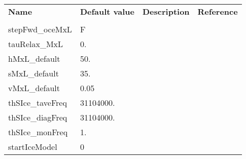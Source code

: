 \begin{table}
\hspace*{-1.5in}
\begin{tabular}{lllc}

  \textbf{Name}  &  \textbf{Default value}  
    &  \textbf{Description}   &  \textbf{Reference}  \\
  & & & \\

  stepFwd\_oceMxL  &   F
    &  %
    &  %
    \\
  tauRelax\_MxL   &   0.
    &  %
    &  %
    \\
  hMxL\_default   &   50.
    &  %
    &  %
    \\
  sMxL\_default   &   35.
    &  %
    &  %
    \\
  vMxL\_default   &   0.05
    &  %
    &  %
    \\
  thSIce\_taveFreq  &   31104000.
    &  %
    &  %
    \\
  thSIce\_diagFreq  &   31104000.
    &  %
    &  %
    \\
  thSIce\_monFreq   &   1.
    &  %
    &  %
    \\
  startIceModel   &   0
    &  %
    &  %
    \\

\end{tabular}
\end{table}

